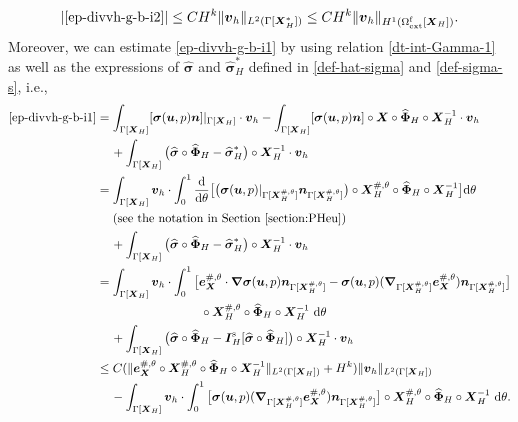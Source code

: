 \documentclass[11pt,reqno]{amsart}
\theoremstyle{definition}
\theoremstyle{plain}
\numberwithin{theorem}{section}
\numberwithin{proposition}{section}
\numberwithin{lemma}{section}
\numberwithin{equation}{section}
\newcommand{\bs}[1]{\boldsymbol{#1}}
\newcommand{\uu}[1]  {{\bs{#1}} }
\newcommand{\grad}   { \uu{\nabla}    }
\def\d{\mathrm{d}}
\newcommand{\bv}{{\bs v}}
\newcommand{\bu}{\uu{u}}
\renewcommand{\(}{\bigl(}
\renewcommand{\)}{\bigr)}
\begin{document}
\begin{align}\label{ep-divvh-g-b-i2e}
|\eqref{ep-divvh-g-b-i2}|
\le CH^k \|{\bs v}_h\|_{L^2(\Gamma[\bs X_H^*])} 
\le CH^k \|{\bs v}_h\|_{H^1(\Omega^{\rm f}_{\rm ext}[\bs X_H])} . 
\end{align}
Moreover, we can estimate \eqref{ep-divvh-g-b-i1} by using relation \eqref{dt-int-Gamma-1} as well as the expressions of $\widehat{\bs\sigma}$ and $\widehat{\bs\sigma}_H^*$ defined in  \eqref{def-hat-sigma} and \eqref{def-sigma-s}, i.e., 
\begin{subequations}\label{ep-divvh-g-b-ji3}
\begin{align}
\eqref{ep-divvh-g-b-i1} 
& = 
\int_{\Gamma[\bs X_H]} [{\bs\sigma}(\bu,p){\bs n}]|_{\Gamma[\bs X_H]}\cdot\bv_h 
- \int_{\Gamma[\bs X_H]} [{\bs\sigma}(\bu,p){\bs n}]\circ{\bs X}\circ\widehat{\bs\Phi}_H \circ{\bs X}_H^{-1} \cdot \bv_h \notag\\
&\quad\, + 
\int_{\Gamma[\bs X_H]} \big(\widehat{\bs\sigma}\circ\widehat{\bs\Phi}_H - {\widehat{\bs\sigma}}_H^* \big)\circ{\bs X}_H^{-1} \cdot\bv_h \notag\\
& = \int_{\Gamma[\bs X_H]} \bv_h\cdot \int_0^1\frac{\d}{\d\theta} \big[\big( {\bs\sigma}(\bu,p)|_{\Gamma[{\bs X}_H^{\#,\theta}]} {\bs n}_{\Gamma[{\bs X}_H^{\#,\theta}]}\big)\circ{\bs X}_H^{\#,\theta}\circ\widehat{\bs\Phi}_H \circ{\bs X}_H^{-1} \big]\d\theta \notag\\ 
&\quad\,\,\mbox{(see the notation in Section \ref{section:PHeu})} \notag\\
&\quad\, + 
\int_{\Gamma[\bs X_H]} \big(\widehat{\bs\sigma}\circ\widehat{\bs\Phi}_H - {\widehat{\bs\sigma}}_H^* \big)\circ{\bs X}_H^{-1} \cdot\bv_h  \notag\\
& = \int_{\Gamma[\bs X_H]} \bv_h\cdot\int_0^1\big[ {\bs e}_{\bs X}^{\#,\theta}\cdot\grad {\bs\sigma}(\bu,p) {\bs n}_{\Gamma[{\bs X}_H^{\#,\theta}]} - {\bs\sigma}(\bu,p) (\grad_{\Gamma[{\bs X}_H^{\#,\theta}]}{\bs e}_{\bs X}^{\#,\theta}){\bs n}_{\Gamma[{\bs X}_H^{\#,\theta}]} \big] \notag\\
&\hspace{85pt} \circ{\bs X}_H^{\#,\theta}\circ\widehat{\bs\Phi}_H \circ{\bs X}_H^{-1}  \,\, \d\theta \notag\\ 
&\quad\, + 
\int_{\Gamma[\bs X_H]} \big(\widehat{\bs\sigma}\circ\widehat{\bs\Phi}_H - {\bs I}_H^{\rm s}[\widehat{\bs\sigma}\circ\widehat{\bs\Phi}_H] \big)\circ{\bs X}_H^{-1} \cdot\bv_h \notag\\ 
&\le C( \|{\bs e}_{\bs X}^{\#,\theta}\circ{\bs X}_H^{\#,\theta}\circ\widehat{\bs\Phi}_H \circ{\bs X}_H^{-1}\|_{L^2(\Gamma[\bs X_H])} + H^k) \|{\bs v}_h\|_{L^2(\Gamma[\bs X_H])} \label{ep-divvh-g-b-j} \\
&\quad\, 
- \int_{\Gamma[\bs X_H]} \bv_h\cdot\int_0^1 \big[{\bs\sigma}(\bu,p) (\grad_{\Gamma[{\bs X}_H^{\#,\theta}]}{\bs e}_{\bs X}^{\#,\theta}){\bs n}_{\Gamma[{\bs X}_H^{\#,\theta}]} \big]\circ{\bs X}_H^{\#,\theta}\circ\widehat{\bs\Phi}_H \circ{\bs X}_H^{-1}  \,\, \d\theta . \label{ep-divvh-g-b-i3} 
\end{align}
\end{subequations}
\end{document}
